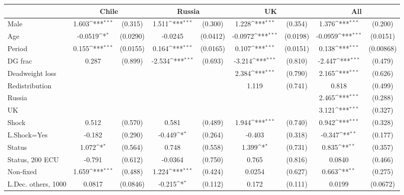 {
\def\sym#1{\ifmmode^{#1}\else\(^{#1}\)\fi}
\begin{tabular}{l*{4}{cc}}
\hline\hline
                &\multicolumn{2}{c}{Chile}   &\multicolumn{2}{c}{Russia}  &\multicolumn{2}{c}{UK}      &\multicolumn{2}{c}{All}     \\
\hline
Male            &    1.603\sym{***}&  (0.315)&    1.511\sym{***}&  (0.300)&    1.228\sym{***}&  (0.354)&    1.376\sym{***}&  (0.200)\\
Age             &  -0.0519\sym{*}  & (0.0290)&  -0.0245         & (0.0412)&  -0.0972\sym{***}& (0.0198)&  -0.0959\sym{***}& (0.0151)\\
Period          &    0.155\sym{***}& (0.0155)&    0.164\sym{***}& (0.0165)&    0.107\sym{***}& (0.0151)&    0.138\sym{***}&(0.00868)\\
DG frac         &    0.287         &  (0.899)&   -2.534\sym{***}&  (0.693)&   -3.214\sym{***}&  (0.810)&   -2.447\sym{***}&  (0.479)\\
Deadweight loss &                  &         &                  &         &    2.384\sym{***}&  (0.790)&    2.165\sym{***}&  (0.626)\\
Redistribution  &                  &         &                  &         &    1.119         &  (0.741)&    0.818         &  (0.499)\\
Russia          &                  &         &                  &         &                  &         &    2.465\sym{***}&  (0.288)\\
UK              &                  &         &                  &         &                  &         &    3.121\sym{***}&  (0.327)\\
Shock           &    0.512         &  (0.570)&    0.581         &  (0.489)&    1.944\sym{***}&  (0.740)&    0.942\sym{***}&  (0.328)\\
L.Shock=Yes     &   -0.182         &  (0.290)&   -0.449\sym{*}  &  (0.264)&   -0.403         &  (0.318)&   -0.347\sym{**} &  (0.177)\\
Status          &    1.072\sym{*}  &  (0.564)&    0.748         &  (0.558)&    1.399\sym{*}  &  (0.731)&    0.835\sym{**} &  (0.357)\\
Status, 200 ECU &   -0.791         &  (0.612)&  -0.0364         &  (0.750)&    0.765         &  (0.816)&   0.0840         &  (0.466)\\
Non-fixed       &    1.659\sym{***}&  (0.488)&    1.224\sym{***}&  (0.424)&   0.0254         &  (0.627)&    0.663\sym{**} &  (0.275)\\
L.Dec. others, 1000&   0.0817         & (0.0846)&   -0.215\sym{*}  &  (0.112)&    0.172         &  (0.111)&   0.0199         & (0.0672)\\

\end{tabular}}
